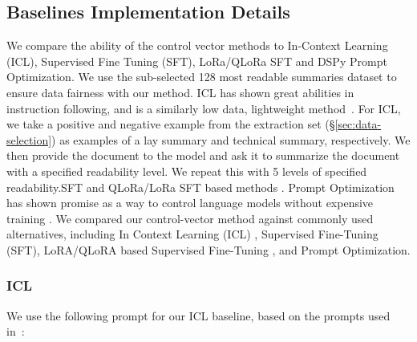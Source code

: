 
\subsection{Baselines Implementation Details}\label{sec:base-details}
We compare the ability of the control vector methods to In-Context Learning (ICL), Supervised Fine Tuning (SFT), LoRa/QLoRa SFT and DSPy Prompt Optimization. We use the sub-selected 128 most readable summaries dataset to ensure data fairness with our method.
 ICL has shown great abilities in instruction following, and is a similarly low data, lightweight method~\cite{Brown2020LanguageMA}. For ICL, we take a positive and negative example from the extraction set (\S\ref{sec:data-selection}) as examples of a lay summary and technical summary, respectively. We then provide the document to the model and ask it to summarize the document with a specified readability level. We repeat this with 5 levels of specified readability.SFT and QLoRa/LoRa SFT based methods \cite{hu2021loralowrankadaptationlarge, dettmers2023qloraefficientfinetuningquantized}.  Prompt Optimization has shown promise as a way to control language models without expensive training \cite{khattab2023dspycompilingdeclarativelanguage}. 
We compared our control-vector method against commonly used alternatives, including In Context Learning (ICL) \cite{Brown2020LanguageMA}, Supervised Fine-Tuning (SFT), LoRA/QLoRA based Supervised Fine-Tuning \cite{hu2021loralowrankadaptationlarge, dettmers2023qloraefficientfinetuningquantized}, and Prompt Optimization.
\subsubsection{ICL}
We use the following prompt for our ICL baseline, based on the prompts used in~\cite{ribeiro-etal-2023-generating}:


